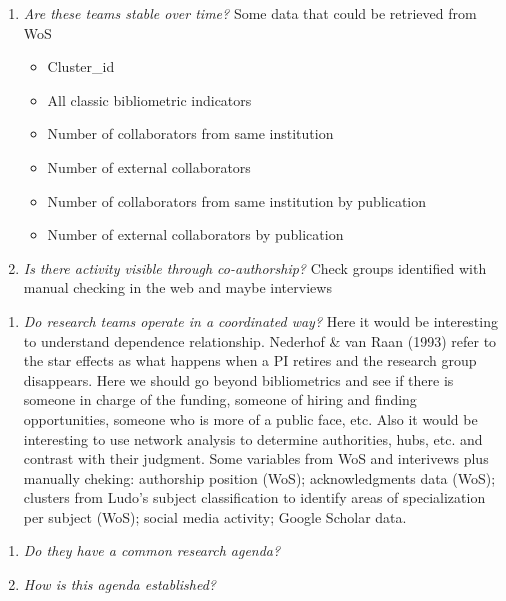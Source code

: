\documentclass[]{article}
\providecommand{\tightlist}{%
  \setlength{\itemsep}{0pt}\setlength{\parskip}{0pt}}
\begin{document}
\begin{enumerate}
\def\labelenumi{\roman{enumi}.}
\item
  \emph{Are these teams stable over time?} Some data that could be
  retrieved from WoS

  \begin{itemize}
  \tightlist
  \item
    Cluster\_id
  \item
    All classic bibliometric indicators
  \item
    Number of collaborators from same institution
  \item
    Number of external collaborators
  \item
    Number of collaborators from same institution by publication
  \item
    Number of external collaborators by publication
  \end{itemize}
\item
  \emph{Is there activity visible through co-authorship?} Check groups
  identified with manual checking in the web and maybe interviews
\end{enumerate}

\begin{enumerate}
\def\labelenumi{\arabic{enumi}.}
\setcounter{enumi}{1}
\tightlist
\item
  \emph{Do research teams operate in a coordinated way?} Here it would
  be interesting to understand dependence relationship. Nederhof \& van
  Raan (1993) refer to the star effects as what happens when a PI
  retires and the research group disappears. Here we should go beyond
  bibliometrics and see if there is someone in charge of the funding,
  someone of hiring and finding opportunities, someone who is more of a
  public face, etc. Also it would be interesting to use network analysis
  to determine authorities, hubs, etc. and contrast with their judgment.
  Some variables from WoS and interivews plus manually cheking:
  authorship position (WoS); acknowledgments data (WoS); clusters from
  Ludo's subject classification to identify areas of specialization per
  subject (WoS); social media activity; Google Scholar data.
\end{enumerate}

\begin{enumerate}
\def\labelenumi{\roman{enumi}.}
\tightlist
\item
  \emph{Do they have a common research agenda?}
\item
  \emph{How is this agenda established?}
\end{enumerate}
\end{document}
